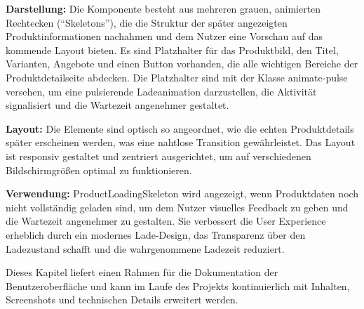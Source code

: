 \documentclass[12pt, a4paper]{report} %
\begin{document}
\textbf{Darstellung:}
Die Komponente besteht aus mehreren grauen, animierten Rechtecken (``Skeletons''), die die Struktur der später angezeigten Produktinformationen nachahmen und dem Nutzer eine Vorschau auf das kommende Layout bieten. Es sind Platzhalter für das Produktbild, den Titel, Varianten, Angebote und einen Button vorhanden, die alle wichtigen Bereiche der Produktdetailseite abdecken. Die Platzhalter sind mit der Klasse animate-pulse versehen, um eine pulsierende Ladeanimation darzustellen, die Aktivität signalisiert und die Wartezeit angenehmer gestaltet.

\textbf{Layout:}
Die Elemente sind optisch so angeordnet, wie die echten Produktdetails später erscheinen werden, was eine nahtlose Transition gewährleistet. Das Layout ist responsiv gestaltet und zentriert ausgerichtet, um auf verschiedenen Bildschirmgrößen optimal zu funktionieren.

\noindent\textbf{Verwendung:} ProductLoadingSkeleton wird angezeigt, wenn Produktdaten noch nicht vollständig geladen sind, um dem Nutzer visuelles Feedback zu geben und die Wartezeit angenehmer zu gestalten. Sie verbessert die User Experience erheblich durch ein modernes Lade-Design, das Transparenz über den Ladezustand schafft und die wahrgenommene Ladezeit reduziert.

\vspace{1em}
\noindent
Dieses Kapitel liefert einen Rahmen für die Dokumentation der Benutzeroberfläche und kann im Laufe des Projekts kontinuierlich mit Inhalten, Screenshots und technischen Details erweitert werden.
\end{document}

